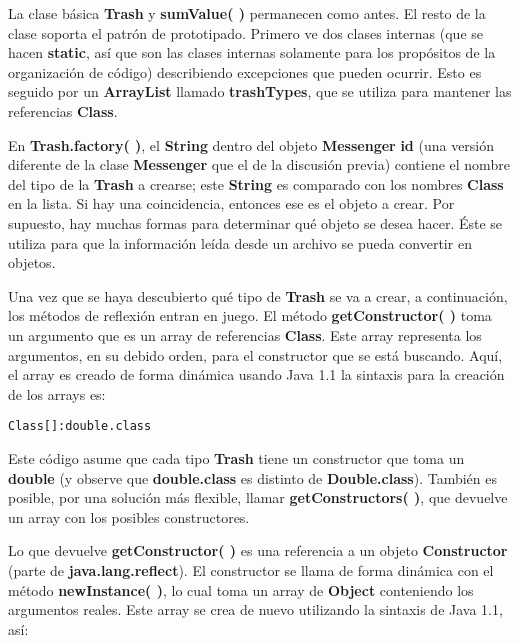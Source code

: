 La clase básica \textbf{Trash} y \textbf{sumValue( )} permanecen como antes. El resto de la clase soporta el patrón de prototipado. Primero ve dos clases internas (que se hacen \textbf{static}, así que son las clases internas solamente para los propósitos de la organización de código) describiendo excepciones que pueden ocurrir. Esto es seguido por un  \textbf{ArrayList} llamado \textbf{trashTypes}, que se utiliza para mantener las referencias \textbf{Class}.    \newline

En \textbf{Trash.factory( )}, el \textbf{String} dentro del objeto \textbf{Messenger} \textbf{id} (una versión diferente de la clase \textbf{Messenger} que el de la discusión previa) contiene el nombre del tipo de la \textbf{Trash} a crearse; este \textbf{String} es comparado con los nombres \textbf{Class} en la lista. Si hay una coincidencia, entonces ese es el objeto a crear. Por supuesto, hay muchas formas para determinar qué objeto se desea hacer. Éste se utiliza para que la información leída desde un archivo se pueda convertir en objetos.    \newline

Una vez que se haya descubierto qué tipo de \textbf{Trash} se va a crear, a continuación, los métodos de reflexión entran en juego. El método \textbf{getConstructor( )} toma un argumento que es un array de referencias \textbf{Class}. Este array representa los argumentos, en su debido orden, para el constructor que se está buscando. Aquí, el array es creado de forma dinámica usando Java 1.1 la sintaxis para la creación de los arrays es:  \newline

\begin{lstlisting} 
Class[]:double.class
\end{lstlisting}

Este código asume que cada tipo \textbf{Trash} tiene un constructor que toma un \textbf{double} (y observe que \textbf{double.class} es distinto de \textbf{Double.class}). También es posible, por una solución más flexible, llamar \textbf{getConstructors( )}, que devuelve un array con los posibles constructores.  \newline

Lo que devuelve \textbf{getConstructor( )} es una referencia a un objeto \textbf{Constructor} (parte de \textbf{java.lang.reflect}). El constructor se llama de forma dinámica con el método \textbf{newInstance( )}, lo cual toma un array de \textbf{Object} conteniendo los argumentos reales. Este array se crea de nuevo utilizando la sintaxis de Java 1.1, así:    \newline

